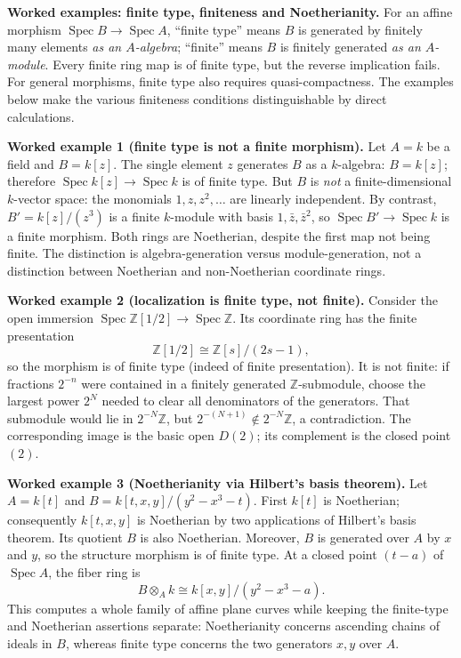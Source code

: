 \par\medskip
\noindent\textbf{Worked examples: finite type, finiteness and Noetherianity.}
For an affine morphism $\operatorname{Spec}B\to\operatorname{Spec}A$,
``finite type'' means $B$ is generated by finitely many elements
\emph{as an $A$-algebra}; ``finite'' means $B$ is finitely generated
\emph{as an $A$-module}.  Every finite ring map is of finite type,
but the reverse implication fails.  For general morphisms, finite type
also requires quasi-compactness.  The examples below make the
various finiteness conditions distinguishable by direct calculations.

\par\medskip
\noindent\textbf{Worked example 1 (finite type is not a finite morphism).}
Let $A=k$ be a field and $B=k[z]$.
The single element $z$ generates $B$ as a $k$-algebra:
$B=k[z]$; therefore
$\operatorname{Spec}k[z]\to\operatorname{Spec}k$ is of finite type.
But $B$ is \emph{not} a finite-dimensional $k$-vector space: the
monomials $1,z,z^2,\ldots$ are linearly independent.
By contrast, $B'=k[z]/(z^3)$ is a finite $k$-module with basis
$1,\bar z,\bar z^2$, so $\operatorname{Spec}B'\to\operatorname{Spec}k$
is a finite morphism.  Both rings are Noetherian, despite the first
map not being finite.  The distinction is algebra-generation versus
module-generation, not a distinction between Noetherian and
non-Noetherian coordinate rings.

\par\medskip
\noindent\textbf{Worked example 2 (localization is finite type, not finite).}
Consider the open immersion
$\operatorname{Spec}\mathbb Z[1/2]\to\operatorname{Spec}\mathbb Z$.
Its coordinate ring has the finite presentation
\[
\mathbb Z[1/2]\cong\mathbb Z[s]/(2s-1),
\]
so the morphism is of finite type (indeed of finite presentation).
It is not finite: if fractions $2^{-n}$ were contained in a
finitely generated $\mathbb Z$-submodule, choose the largest
power $2^N$ needed to clear all denominators of the generators.
That submodule would lie in $2^{-N}\mathbb Z$, but
$2^{-(N+1)}\notin2^{-N}\mathbb Z$, a contradiction.
The corresponding image is the basic open $D(2)$; its complement
is the closed point $(2)$.

\par\medskip
\noindent\textbf{Worked example 3 (Noetherianity via Hilbert's basis theorem).}
Let $A=k[t]$ and
$B=k[t,x,y]/(y^2-x^3-t)$.
First $k[t]$ is Noetherian; consequently $k[t,x,y]$ is Noetherian
by two applications of Hilbert's basis theorem.  Its quotient $B$
is also Noetherian.  Moreover, $B$ is generated over $A$ by
$x$ and $y$, so the structure morphism is of finite type.
At a closed point $(t-a)$ of $\operatorname{Spec}A$, the fiber ring is
\[
B\otimes_A k\cong k[x,y]/(y^2-x^3-a).
\]
This computes a whole family of affine plane curves while keeping
the finite-type and Noetherian assertions separate:
Noetherianity concerns ascending chains of ideals in $B$,
whereas finite type concerns the two generators $x,y$ over $A$.

